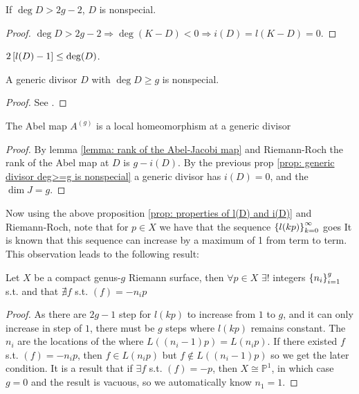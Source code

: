 \documentclass{article}
\begin{document}
\begin{corollary}
	If $\deg D > 2g-2$, $D$ is nonspecial. 
\end{corollary}
\begin{proof}
	$\deg D >2g-2 \Rightarrow \deg(K-D)<0 \Rightarrow i(D) = l(K-D) = 0$. 
\end{proof}

\begin{corollary}
	$2\left[ l(D)-1 \right] \leq \deg(D)$. 
\end{corollary}

\begin{prop}\label{prop: generic divisor deg>=g is nonspecial}
	A generic divisor $D$ with $\deg D \geq g$ is nonspecial. 
\end{prop}
\begin{proof}
	See \cite{Dubrovin2009}.
\end{proof}

\begin{corollary}\label{cor: A^g is a local homeo}
The Abel map $A^{(g)}$ is a local homeomorphism at a generic divisor	
\end{corollary}
\begin{proof}
	By lemma \ref{lemma: rank of the Abel-Jacobi map} and Riemann-Roch the rank of the Abel map at $D$ is $g-i(D)$. By the previous prop \ref{prop: generic divisor deg>=g is nonspecial} a generic divisor has $i(D)=0$, and the $\dim J=g$.  
\end{proof}
Now using the above proposition \ref{prop: properties of l(D) and i(D)} and Riemann-Roch, note that for $p \in X$ we have that the sequence $\left\{ l(kp) \right\}_{k=0}^\infty$ goes 
It is known that this sequence can increase by a maximum of 1 from term to term. This observation leads to the following result:
\begin{theorem}
	Let $X$ be a compact genus-$g$ Riemann surface, then $\forall p \in X$ $\exists!$ integers $\left\{ n_i \right\}_{i=1}^g$ s.t. 
	and that $\nexists f$ s.t. $(f)=-n_ip$
\end{theorem}
\begin{proof}
	As there are $2g-1$ step for $l(kp)$ to increase from $1$ to $g$, and it can only increase in step of $1$, there must be $g$ steps where $l(kp)$ remains constant. The $n_i$ are the locations of the  where $L((n_i-1)p) = L(n_ip)$. If there existed $f$ s.t. $(f) = -n_i p$, then $f \in L(n_i p)$ but $f \not \in L((n_i -1)p)$ so we get the later condition. It is a result that if $\exists f$ s.t. $(f)=-p$, then $X \cong \mathbb{P}^1$, in which case $g=0$ and the result is vacuous, so we automatically know $n_1=1$. 
\end{proof}
\end{document}
